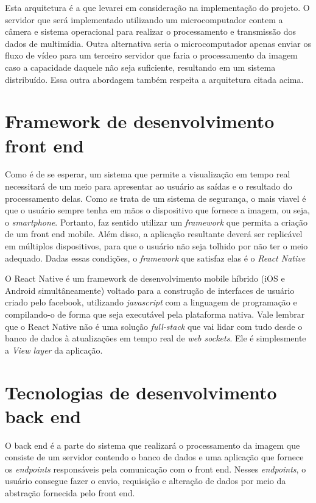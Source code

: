 \documentclass[12pt, %
openright, 
oneside, %
a4paper,    %
brazil]{facom-ufu-abntex2}
\begin{document}
Esta arquitetura é a que levarei em consideração na implementação do projeto. O
servidor que será implementado utilizando um microcomputador contem a câmera e
sistema operacional para realizar o processamento e transmissão dos dados de
multimídia. Outra alternativa seria o microcomputador apenas enviar os fluxo de
vídeo para um terceiro servidor que faria o processamento da imagem caso a
capacidade daquele não seja suficiente, resultando em um sistema distribuído.
Essa outra abordagem também respeita a arquitetura citada acima.

\section{Framework de desenvolvimento front end}

Como é de se esperar, um sistema que permite a visualização em tempo real
necessitará de um meio para apresentar ao usuário as saídas e o resultado do
processamento delas. Como se trata de um sistema de segurança, o mais viavel é
que o usuário sempre tenha em mãos o dispositivo que fornece a imagem, ou seja,
o \emph{smartphone}. Portanto, faz sentido utilizar um \emph{framework} que
permita a criação de um front end mobile. Além disso, a aplicação resultante
deverá ser replicável em múltiplos dispositivos, para que o usuário não seja
tolhido por não ter o meio adequado. Dadas essas condições, o \emph{framework}
que satisfaz elas é o \emph{React Native}

O React Native é um framework de desenvolvimento mobile híbrido (iOS e Android
simultâneamente) voltado para a construção de interfaces de usuário criado pelo
facebook, utilizando \emph{javascript} com a linguagem de programação e
compilando-o de forma que seja executável pela plataforma nativa. Vale lembrar
que o React Native não é uma solução \emph{full-stack} que vai lidar com tudo
desde o banco de dados à atualizações em tempo real de \emph{web sockets}. Ele
é simplesmente a \emph{View layer} da aplicação. \cite{boduch2017react}

\section{Tecnologias de desenvolvimento back end}

O back end é a parte do sistema que realizará o processamento da imagem que
consiste de um servidor contendo o banco de dados e uma aplicação que fornece
os \emph{endpoints} responsáveis pela comunicação com o front end. Nesses
\emph{endpoints}, o usuário consegue fazer o envio, requisição e alteração de
dados por meio da abstração fornecida pelo front end.
\end{document}
